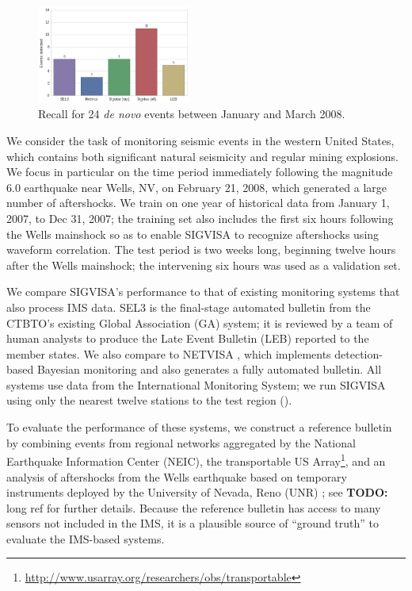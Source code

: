 \documentclass[twoside]{article} \usepackage{aistats2017}
\newcommand{\todo}[1]{{\color{red} \textbf{TODO:} {#1}}}
\begin{document}
\begin{figure}
\centering

\includegraphics[width=0.45\textwidth]{denovo_recall}
\caption{Recall for 24 {\em de novo} events between January and March
2008. }
\label{fig:denovo_results}
\end{figure}

We consider the task of monitoring seismic events in the western
United States, which contains both significant natural seismicity and
regular mining explosions. We focus in particular on the time period
immediately following the magnitude 6.0 earthquake near Wells, NV, on
February 21, 2008, which generated a large number of aftershocks. We
train on one year of historical data from January 1, 2007, to Dec 31,
2007; the training set also includes the first six hours following the Wells mainshock so
as to enable SIGVISA to recognize aftershocks using waveform correlation. The test period is two weeks long, beginning twelve hours
after the Wells mainshock; the intervening six hours was used as a validation set.

We compare SIGVISA's performance to that of existing monitoring
systems that also process IMS data. SEL3 is the final-stage automated
bulletin from the CTBTO's existing Global Association (GA) system; it
is reviewed by a team of human analysts to produce the Late Event
Bulletin (LEB) reported to the member states. We also compare to
NETVISA \citep{arora2013net}, which implements detection-based
Bayesian monitoring and also generates a fully automated bulletin. All
systems use data from the International Monitoring System; we run
SIGVISA using only the nearest twelve stations to the test region
().

To evaluate the performance of these systems, we construct a reference
bulletin by combining events from regional networks aggregated by the
National Earthquake Information Center (NEIC), the transportable US
Array\footnote{\url{http://www.usarray.org/researchers/obs/transportable}},
and an analysis of aftershocks from the Wells earthquake based on
temporary instruments deployed by the University of Nevada, Reno (UNR)
\citep{smith2011preliminary}; see \todo{long ref} for further
details. Because the reference bulletin has access to many 
sensors not included in the IMS, it is a plausible source of ``ground
truth'' to evaluate the IMS-based systems. 
\end{document}

